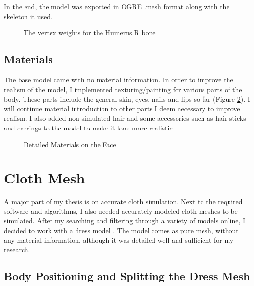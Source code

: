 In the end, the model was exported in OGRE .mesh format along with the skeleton it used.

\begin{figure}[h]
\centerline{}
\caption{The vertex weights for the Humerus.R bone}
\label{fig:weight_humerus_r}
\end{figure}

\subsection{Materials}

The base model came with no material information. In order to improve the realism of the model, I implemented texturing/painting for various parts of the body. These parts include the general skin, eyes, nails and lips so far (Figure \ref{fig:detailed_face}).  I will continue material introduction to other parts I deem necessary to improve realism. I also added non-simulated hair and some accessories such as hair sticks and earrings to the model to make it look more realistic.

\begin{figure}[h]
\centerline{}
\caption{Detailed Materials on the Face}
\label{fig:detailed_face}
\end{figure}

\section{Cloth Mesh}
\label{section4_2}

A major part of my thesis is on accurate cloth simulation. Next to the required software and algorithms, I also needed accurately modeled cloth meshes to be simulated. After my searching and filtering through a variety of models online, I decided to work with a dress model \cite{LadyJewell2012}. The model comes as pure mesh, without any material information, although it was detailed well and sufficient for my research.

\subsection{Body Positioning and Splitting the Dress Mesh}

